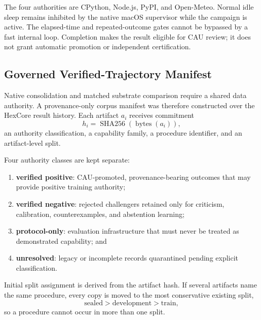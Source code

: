 The four authorities are CPython, Node.js, PyPI, and Open-Meteo.  Normal idle
sleep remains inhibited by the native macOS supervisor while the campaign is
active.  The elapsed-time and repeated-outcome gates cannot be bypassed by a
fast internal loop.  Completion makes the result eligible for CAU review; it
does not grant automatic promotion or independent certification.

\subsection{Governed Verified-Trajectory Manifest}
\label{subsec:verified-trajectory-manifest}

Native consolidation and matched substrate comparison require a shared data
authority.  A provenance-only corpus manifest was therefore constructed over
the HexCore result history.  Each artifact $a_i$ receives commitment
\begin{equation}
 h_i=\operatorname{SHA256}(\operatorname{bytes}(a_i)),
\end{equation}
an authority classification, a capability family, a procedure identifier, and
an artifact-level split.

Four authority classes are kept separate:
\begin{enumerate}
 \item \textbf{verified positive}: CAU-promoted, provenance-bearing outcomes
 that may provide positive training authority;
 \item \textbf{verified negative}: rejected challengers retained only for
 criticism, calibration, counterexamples, and abstention learning;
 \item \textbf{protocol-only}: evaluation infrastructure that must never be
 treated as demonstrated capability; and
 \item \textbf{unresolved}: legacy or incomplete records quarantined pending
 explicit classification.
\end{enumerate}

Initial split assignment is derived from the artifact hash.  If several
artifacts name the same procedure, every copy is moved to the most conservative
existing split,
\begin{equation}
 \mathrm{sealed}>\mathrm{development}>\mathrm{train},
\end{equation}
so a procedure cannot occur in more than one split.

